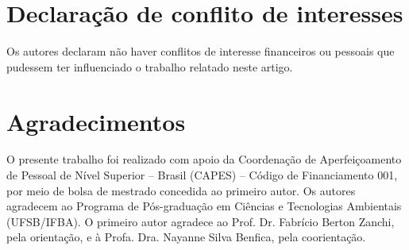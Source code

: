 \documentclass[a4paper,fleqn]{cas-dc}
\begin{document}
\section*{Declaração de conflito de interesses}
Os autores declaram não haver conflitos de interesse financeiros ou pessoais que pudessem ter influenciado o trabalho relatado neste artigo.

\section*{Agradecimentos}
O presente trabalho foi realizado com apoio da Coordenação de Aperfeiçoamento de Pessoal de Nível Superior -- Brasil (CAPES) -- Código de Financiamento 001, por meio de bolsa de mestrado concedida ao primeiro autor. Os autores agradecem ao Programa de Pós-graduação em Ciências e Tecnologias Ambientais (UFSB/IFBA). O primeiro autor agradece ao Prof. Dr. Fabrício Berton Zanchi, pela orientação, e à Profa. Dra. Nayanne Silva Benfica, pela coorientação.

\printcredits



\end{document}
